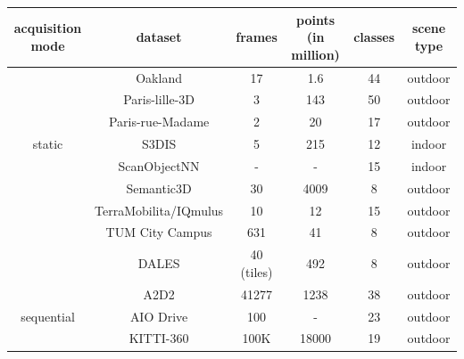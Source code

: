\begin{table}[h!]
    \begin{tabular}{c|c|c|c|c|c}%
        \hline
        acquisition mode & dataset & frames & points (in million) & classes & scene type \\  %
        \hline
        \multirow{7}{*}{static} & Oakland\cite{oakland} & 17 & 1.6 &  44 & outdoor \\ %
                                & Paris-lille-3D\cite{roynard2018paris} & 3 & 143 & 50 & outdoor \\ %
                                & Paris-rue-Madame\cite{paris_rue_madame} & 2 & 20 & 17 & outdoor \\ %
                                & S3DIS\cite{Armeni_2016_CVPR_S3DIS} & 5 & 215 & 12 & indoor \\ %
                                & ScanObjectNN\cite{scanobejctnn} & - & - & 15 & indoor \\ %
                                & Semantic3D\cite{hackel2017semantic3d} & 30 & 4009 & 8 & outdoor \\ %
                                & TerraMobilita/IQmulus\cite{TerraMobilita} & 10 & 12 & 15 & outdoor\\ %
                                & TUM City Campus\cite{gehrung2017approach_tum_campus} & 631 & 41 & 8 & outdoor\\ %
                                & DALES\cite{varney2020dales} & 40 (tiles) & 492 & 8 & outdoor\\ %
        \hline
        \multirow{7}{*}{sequential} & A2D2\cite{geyer2020a2d2} & 41277 & 1238 & 38 & outdoor\\ %
                                    & AIO Drive\cite{Weng2020_AIODrive} & 100& - & 23 & outdoor\\ %
                                    & KITTI-360\cite{Xie_2016_CVPR_KITTI_360} & 100K & 18000 & 19 & outdoor\\ %

\end{tabular}
\end{table}

